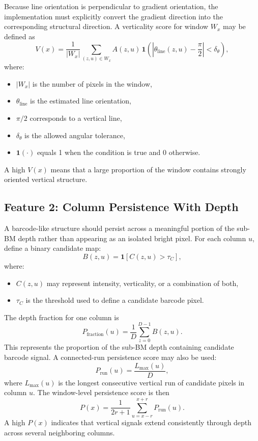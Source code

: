 \documentclass[11pt]{article}
\begin{document}
Because line orientation is perpendicular to gradient orientation, the
implementation must explicitly convert the gradient direction into the
corresponding structural direction.
A verticality score for window \(W_x\) may be defined as
\[
V(x)
=
\frac{1}{|W_x|}
\sum_{(z,u)\in W_x}
A(z,u)
\,
\mathbf{1}
\left(
\left|
\theta_{\mathrm{line}}(z,u)
-
\frac{\pi}{2}
\right|
<
\delta_{\theta}
\right),
\]
where:
\begin{itemize}
    \item \(|W_x|\) is the number of pixels in the window,
    \item \(\theta_{\mathrm{line}}\) is the estimated line orientation,
    \item \(\pi/2\) corresponds to a vertical line,
    \item \(\delta_{\theta}\) is the allowed angular tolerance,
    \item \(\mathbf{1}(\cdot)\) equals 1 when the condition is true and 0
    otherwise.
\end{itemize}

A high \(V(x)\) means that a large proportion of the window contains strongly
oriented vertical structure.


\subsection{Feature 2: Column Persistence With Depth}
A barcode-like structure should persist across a meaningful portion of the
sub-BM depth rather than appearing as an isolated bright pixel.
For each column \(u\), define a binary candidate map:
\[
B(z,u)
=
\mathbf{1}
\left[
C(z,u)>\tau_C
\right],
\]
where:
\begin{itemize}
    \item \(C(z,u)\) may represent intensity, verticality, or a combination of
    both,
    \item \(\tau_C\) is the threshold used to define a candidate barcode pixel.
\end{itemize}
The depth fraction for one column is
\[
P_{\mathrm{fraction}}(u)
=
\frac{1}{D}
\sum_{z=0}^{D-1}
B(z,u).
\]
This represents the proportion of the sub-BM depth containing candidate
barcode signal.
A connected-run persistence score may also be used:
\[
P_{\mathrm{run}}(u)
=
\frac{
L_{\max}(u)
}{
D
},
\]
where \(L_{\max}(u)\) is the longest consecutive vertical run of candidate
pixels in column \(u\).
The window-level persistence score is then
\[
P(x)
=
\frac{1}{2r+1}
\sum_{u=x-r}^{x+r}
P_{\mathrm{run}}(u).
\]
A high \(P(x)\) indicates that vertical signals extend consistently through
depth across several neighboring columns.
\end{document}
